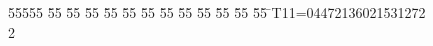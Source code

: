 %
%
\begin{tabbing}
55555 \= 55 \= 55 \= 55 \= 55 \= 55 \= 55 \= 55 \= 55 \= 55 \= 55 \= 55 \= 55 \= \>T11=04472136021531272\\[0pt]
2\>\end{tabbing}
